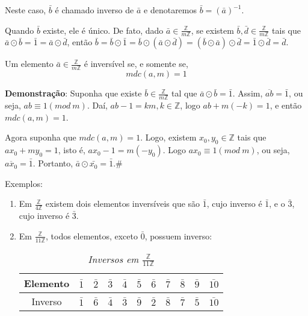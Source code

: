 Neste caso, $\bar{b}$ é chamado inverso de $\bar{a}$ e denotaremos $\bar{b}=(\bar{a})^{-1}$.

Quando $\bar{b}$ existe, ele é único. De fato, dado $\bar{a}\in\displaystyle\frac{\mathbb{Z}}{m\mathbb{Z}}$, se existem $\bar{b},\bar{d}\in\displaystyle\frac{\mathbb{Z}}{m\mathbb{Z}}$ tais que $\bar{a}\odot\bar{b}=\bar{1}=\bar{a}\odot\bar{d}$, então $\bar{b}=\bar{b}\odot\bar{1}=\bar{b}\odot (\bar{a}\odot\bar{d})=(\bar{b}\odot\bar{a})\odot\bar{d}=\bar{1}\odot\bar{d}=\bar{d}$.

\begin{proposicao} Um elemento $\bar{a}\in\displaystyle\frac{\mathbb{Z}}{m\mathbb{Z}}$ é inversível se, e somente se,
 \[mdc(a,m)=1\]
\end{proposicao}

\textbf{Demonstração}: Suponha que existe $\bar{b}\in\displaystyle\frac{\mathbb{Z}}{m\mathbb{Z}}$ tal que $\bar{a}\odot\bar{b}=\bar{1}$. Assim, $\overline{ab}=\bar{1}$, ou seja, $ab\equiv 1(mod\ m)$. Daí, $ab-1=km, k\in\mathbb{Z}$, logo $ab+m(-k)=1$, e então $mdc(a,m)=1$.

Agora suponha que $mdc(a,m)=1$. Logo, existem $x_{0}, y_{0}\in\mathbb{Z}$ tais que $ax_{0}+my_{0}=1$, isto é, $ax_{0}-1=m(-y_{0})$. Logo $ax_{0}\equiv 1(mod\ m)$, ou seja, $\overline{ax_{0}}=\bar{1}$. Portanto, $\bar{a}\odot\bar{x_{0}}=\bar{1}$.\#

Exemplos:
\begin{enumerate}
\item Em $\displaystyle\frac{\mathbb{Z}}{4\mathbb{Z}}$ existem dois elementos inversíveis que são $\bar{1}$, cujo inverso é $\bar{1}$, e o $\bar{3}$, cujo inverso é $\bar{3}$.
\item Em $\displaystyle\frac{\mathbb{Z}}{11\mathbb{Z}} $, todos elementos, exceto $\bar{0}$, possuem inverso:

\begin{table}[h]
   \centering
   \setlength{\arrayrulewidth}{0,5\arrayrulewidth}
   \caption{\it Inversos em $\displaystyle\frac{\mathbb{Z}}{11\mathbb{Z}}$}
   \begin{tabular}{|c|c|c|c|c|c|c|c|c|c|c|}
      \hline
      Elemento & $\bar{1}$ & $\bar{2}$ & $\bar{3}$ & $\bar{4}$ & $\bar{5}$ & $\bar{6}$ & $\bar{7}$ & $\bar{8}$ & $\bar{9}$ & $\bar{10}$ \\
      \hline
      Inverso & $\bar{1}$ & $\bar{6}$ & $\bar{4}$ & $\bar{3}$ & $\bar{9}$ & $\bar{2}$ & $\bar{8}$ & $\bar{7}$ & $\bar{5}$ & $\bar{10}$ \\
      \hline
   \end{tabular}
\end{table}
\end{enumerate}


